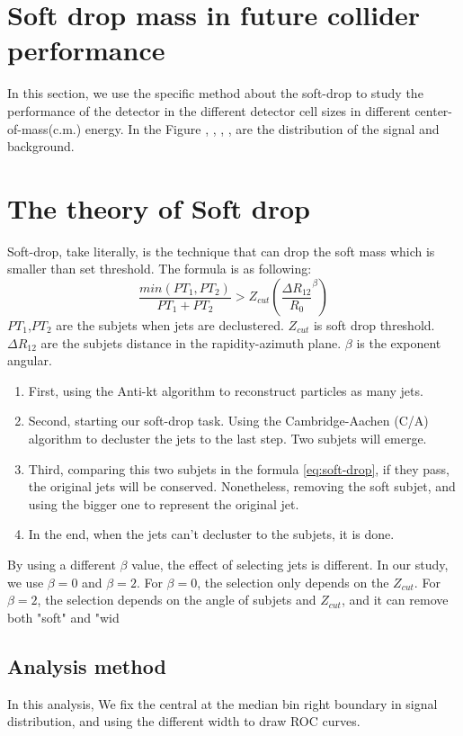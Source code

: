 \documentclass[final,1p,11pt]{elsarticle}
\begin{document}
\section{Soft drop mass in future collider performance}
In this section, we use the specific method about the soft-drop to study the performance of the detector in the different detector cell sizes in different center-of-mass(c.m.) energy.  In the Figure , , , , are the distribution of the signal and background. 
\section{The theory of Soft drop}
Soft-drop, take literally, is the technique that can drop the soft mass which is smaller than set threshold. The formula is as following:
\begin{equation} \label{eq:soft-drop}
\frac{min(PT_{1},PT_{2})}{PT_{1}+PT_{2}}>Z_{cut}(\frac{\Delta R_{12}}{R_{0}}^{\beta})
\end{equation}
$PT_{1}$,$PT_{2}$ are the subjets when jets are declustered. $Z_{cut}$ is soft drop threshold. $\Delta R_{12}$ are the subjets distance in the rapidity-azimuth plane. $\beta$ is the exponent angular.
\begin{enumerate}
\item First, using the Anti-kt algorithm to reconstruct particles as many jets.
\item Second, starting our soft-drop task. Using the Cambridge-Aachen (C/A) algorithm to decluster the jets to the last step. Two subjets will emerge.
\item Third, comparing this two subjets in the formula \ref{eq:soft-drop}, if they pass, the original jets will be conserved. Nonetheless, removing the soft subjet, and using the bigger one to represent the original jet.
\item In the end, when the jets can't decluster to the subjets, it is done.
\end{enumerate}
By using a different $\beta$ value, the effect of selecting jets is different. In our study, we use $\beta=0$ and $\beta=2$. For $\beta=0$, the selection only depends on the $Z_{cut}$. For $\beta=2$, the selection depends on the angle of subjets and $Z_{cut}$, and it can remove both "soft" and "wid\subsection{Analysis method}
In this analysis, We fix the central at the median bin right boundary in signal distribution, and using the different width to draw ROC curves.
\end{document}
